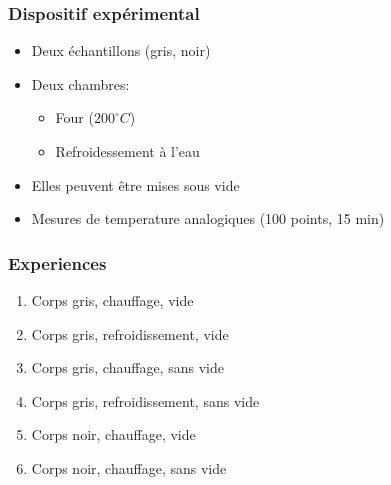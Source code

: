 \documentclass{beamer}
\begin{document}
\begin{frame}
\frametitle{Dispositif expérimental}

\begin{itemize}
	\item{Deux échantillons (gris, noir)\newline}
	\item{Deux chambres:\newline
	\begin{itemize}
		\item{Four ($200^{\circ}C$)\newline}
		\item{Refroidessement à l'eau\newline}
	\end{itemize}}
	\item{Elles peuvent être mises sous vide\newline}
	\item{Mesures de temperature analogiques (100 points, 15 min)}
\end{itemize}
\end{frame}





\begin{frame}
\frametitle{Experiences}

\begin{enumerate}
	\item{{\color{gray7}Corps gris}{\color{gray4}, {\color{red}chauffage}, vide}\newline}
	\item{{\color{gray7}Corps gris}{\color{gray4}, {\color{blue5}refroidissement}, vide}\newline}
	\item{{\color{gray7}Corps gris}{\color{gray4}, {\color{red}chauffage}, sans vide}\newline}
	\item{{\color{gray7}Corps gris}{\color{gray4}, {\color{blue5}refroidissement}, sans vide}\newline}
	\item{{\color{black}Corps noir}{\color{gray4}, {\color{red}chauffage}, vide}\newline}
	\item{{\color{black}Corps noir}{\color{gray4}, {\color{red}chauffage}, sans vide}\newline}

\end{enumerate}
\end{frame}
\end{document}
